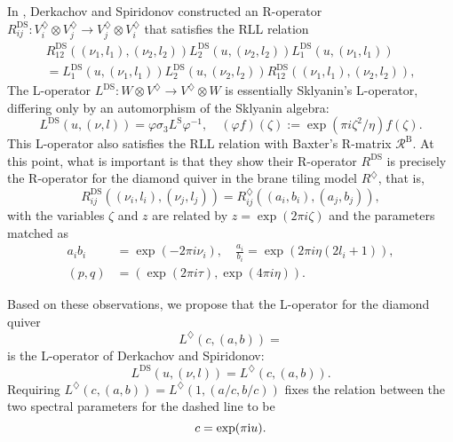 In \cite{Derkachov:2012iv}, Derkachov and Spiridonov constructed
an R-operator $R_{ij}^{\mathrm{DS}}:V_{i}^{\diamondsuit}\otimes V_{j}^{\diamondsuit}\rightarrow V_{j}^{\diamondsuit}\otimes V_{i}^{\diamondsuit}$
that satisfies the RLL relation
\begin{multline}
    R_{12}^{\mathrm{DS}}\left(\left(\nu_{1},l_{1}\right),\left(\nu_{2},l_{2}\right)\right)
    L_{2}^{\mathrm{DS}}\left(u,\left(\nu_{2},l_{2}\right)\right)
    L_{1}^{\mathrm{DS}}\left(u,\left(\nu_{1},l_{1}\right)\right)    \\
      =
        L_{1}^{\mathrm{DS}}\left(u,\left(\nu_{1},l_{1}\right)\right)
        L_{2}^{\mathrm{DS}}\left(u,\left(\nu_{2},l_{2}\right)\right)
        R_{12}^{\mathrm{DS}}\left(\left(\nu_{1},l_{1}\right),\left(\nu_{2},l_{2}\right)\right),
\end{multline}
 The L-operator $L^{\mathrm{DS}}:W\otimes V^{\diamondsuit}\rightarrow V^{\diamondsuit}\otimes W$
is essentially Sklyanin's L-operator, differing only by an automorphism
of the Sklyanin algebra:
\begin{equation}
    L^{\mathrm{DS}}\left(u,\left(\nu,l\right)\right)  
      =  \varphi  \sigma_{3}  L^{\mathrm{S}}\varphi^{-1},  
        \quad  \left(\varphi f\right)(\zeta)  :=  \exp(\pi i\zeta^{2}/\eta)f(\zeta).
\end{equation}
This L-operator also satisfies the RLL relation with Baxter's R-matrix
$\mathcal{R}^{\mathrm{B}}$. At this point, what is important is that
they show their R-operator $R^{\mathrm{DS}}$ is precisely the R-operator
for the diamond quiver in the brane tiling model $R^{\diamondsuit}$,
that is, 
\begin{equation}
    R_{ij}^{\mathrm{DS}}\left(\left(\nu_{i},l_{i}\right),\left(\nu_{j},l_{j}\right)\right)  
      =  
        R_{ij}^{\diamondsuit}\left(\left(a_{i},b_{i}\right),\left(a_{j},b_{j}\right)\right),
\end{equation}
 with the variables $\zeta$ and $z$ are related by $z=\exp(2\pi i\zeta)$
and the parameters matched as
\begin{align}
    a_{i} b_{i}         &  =  \exp(-2\pi i\nu_{i}),  \quad  \frac{a_{i}}{b_{i}}  =  \exp(2\pi i\eta(2l_{i}+1)),  \\
\left( p,q \right) &  =  \left(\exp(2\pi i\tau),\exp(4\pi i\eta)\right).
\end{align}

Based on these observations, we propose that the L-operator for the
diamond quiver 
\begin{equation}
    L^{\diamondsuit}\left(c,\left(a,b\right)\right)=
\end{equation}
 is the L-operator of Derkachov and Spiridonov:
\begin{equation}
    L^{\mathrm{DS}}\left(u,\left(\nu,l\right)\right)  
      =  
        L^{\diamondsuit}\left(c,\left(a,b\right)\right).
\end{equation}
Requiring $L^{\diamondsuit}\left(c,\left(a,b\right)\right)=L^{\diamondsuit}\left(1,\left(a/c,b/c\right)\right)$
fixes the relation between the two spectral parameters for the dashed
line to be
\begin{equation}
    c=\exp(\pi \mathrm{i} u).
\end{equation}

